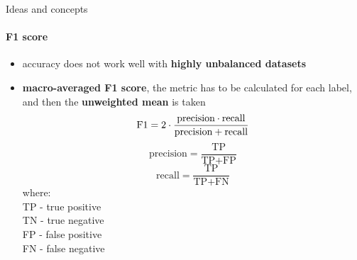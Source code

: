 \documentclass[aspectratio=169, professionalfonts]{beamer}
\begin{document}
\begin{frame}{Ideas and concepts}
    \framesubtitle{F1 score}
	\begin{itemize}
	    \setlength\itemsep{0em}
	    \item accuracy does not work well with \textbf{highly unbalanced datasets}
	    \item \textbf{macro-averaged F1 score}, the metric has to be calculated for each label, and then the \textbf{unweighted mean} is taken
        \begin{equation}
            \centering
            \text{F1} = 2 \cdot \frac{\text{precision} \cdot  \text{recall}}{\text{precision} + \text{recall}}
        \end{equation}
        \begin{equation}
            \text{precision} = \frac{\text{TP}}{\text{TP} + \text{FP}}
        \end{equation}
        \begin{equation}
            \text{recall} = \frac{\text{TP}}{\text{TP} + \text{FN}}
        \end{equation}
        where: \\
        TP - true positive \\
        TN - true negative \\
        FP - false positive \\
        FN - false negative
    \end{itemize}
\end{frame}
\end{document}
